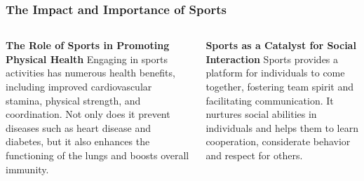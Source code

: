 \documentclass[5pt]{beamer}
\begin{document}
\begin{frame}
\frametitle{The Impact and Importance of Sports}
\begin{columns}
\begin{column}{0.45\textwidth}
\begin{block}{\textbf{The Role of Sports in Promoting Physical Health}}
Engaging in sports activities has numerous health benefits, including improved cardiovascular stamina, physical strength, and coordination. Not only does it prevent diseases such as heart disease and diabetes, but it also enhances the functioning of the lungs and boosts overall immunity.
\end{block}
\end{column}
\begin{column}{0.45\textwidth}
\begin{block}{\textbf{Sports as a Catalyst for Social Interaction}}
Sports provides a platform for individuals to come together, fostering team spirit and facilitating communication. It nurtures social abilities in individuals and helps them to learn cooperation, considerate behavior and respect for others.
\end{block}
\end{column}
\end{columns}
\end{frame}
\end{document}
